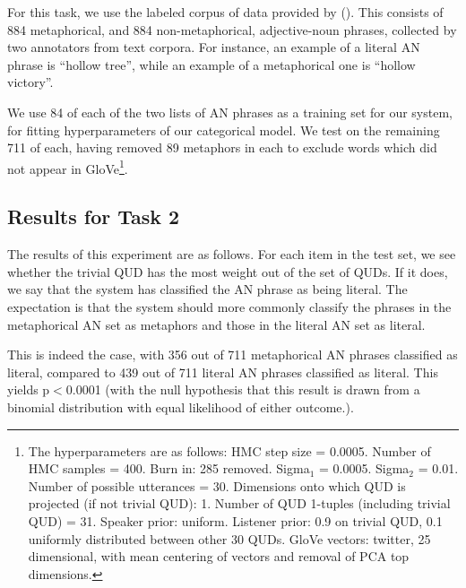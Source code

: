 \documentclass[10pt,letterpaper,twocolumn]{article}
\begin{document}
For this task, we use the labeled corpus of data provided by (\cite{tsvetkov2014metaphor}). This consists of 884 metaphorical, and 884 non-metaphorical, adjective-noun phrases, collected by two annotators from text corpora. For instance, an example of a literal AN phrase is ``hollow tree'', while an example of a metaphorical one is ``hollow victory''.

We use 84 of each of the two lists of AN phrases as a training set for our system, for fitting hyperparameters of our categorical model. We test on the remaining 711 of each, having removed 89 metaphors in each to exclude words which did not appear in GloVe\footnote{The hyperparameters are as follows: HMC step size = 0.0005. Number of HMC samples = 400. Burn in: 285 removed. Sigma$_1$ = 0.0005. Sigma$_2$ = 0.01. Number of possible utterances = 30. Dimensions onto which QUD is projected (if not trivial QUD): 1. Number of QUD 1-tuples (including trivial QUD) = 31. Speaker prior: uniform. Listener prior: 0.9 on trivial QUD, 0.1 uniformly distributed between other 30 QUDs. GloVe vectors: twitter, 25 dimensional, with mean centering of vectors and removal of PCA top dimensions.}.

\subsection{Results for Task 2}

The results of this experiment are as follows. For each item in the test set, we see whether the trivial QUD has the most weight out of the set of QUDs. If it does, we say that the system has classified the AN phrase as being literal. The expectation is that the system should more commonly classify the phrases in the metaphorical AN set as metaphors and those in the literal AN set as literal.

This is indeed the case, with 356 out of 711 metaphorical AN phrases classified as literal, compared to 439 out of 711 literal AN phrases classified as literal. This yields p$<$0.0001 (with the null hypothesis that this result is drawn from a binomial distribution with equal likelihood of either outcome.). 

\end{document}
